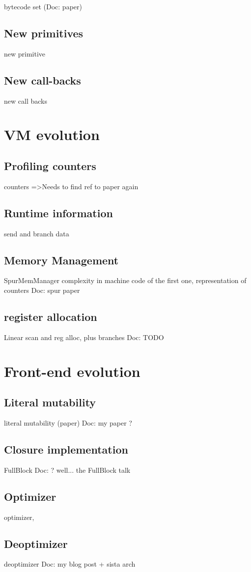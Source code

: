 \documentclass[a4paper,12pt,twoside]{../includes/ThesisStyle}
\begin{document}
bytecode set (Doc: paper)

\subsection{New primitives}

new primitive

\subsection{New call-backs}

new call backs

\section{VM evolution}

\subsection{Profiling counters}
counters
=>Needs to find ref to paper again

\subsection{Runtime information}

send and branch data

\subsection{Memory Management}

SpurMemManager complexity in machine code of the first one, representation of counters
Doc: spur paper

\subsection{register allocation}
Linear scan and reg alloc, plus branches
Doc: TODO

\section{Front-end evolution}

\subsection{Literal mutability}

literal mutability (paper)
Doc: my paper ?

\subsection{Closure implementation}
FullBlock
Doc: ? well... the FullBlock talk

\subsection{Optimizer}
optimizer, 

\subsection{Deoptimizer}
deoptimizer 
Doc: my blog post + sista arch

\ifx\wholebook\relax\else
    
\end{document}
